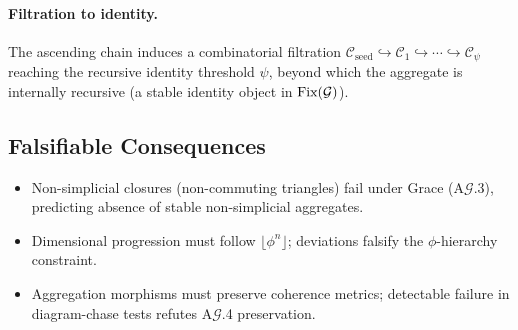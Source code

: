 \paragraph{Filtration to identity.} The ascending chain induces a combinatorial filtration
\(\mathcal C_{\mathrm{seed}}\hookrightarrow \mathcal C_1\hookrightarrow\cdots\hookrightarrow \mathcal C_\psi\)
reaching the recursive identity threshold $\psi$, beyond which the aggregate is internally
recursive (a stable identity object in $\text{Fix}(\mathcal{G})$).

\subsection{Falsifiable Consequences}
\begin{itemize}
  \item Non-simplicial closures (non-commuting triangles) fail under Grace (A$\mathcal G$.3), predicting absence of stable non-simplicial aggregates.
  \item Dimensional progression must follow $\lfloor\phi^n\rfloor$; deviations falsify the $\phi$-hierarchy constraint.
  \item Aggregation morphisms must preserve coherence metrics; detectable failure in diagram-chase tests refutes A$\mathcal G$.4 preservation.
\end{itemize}


